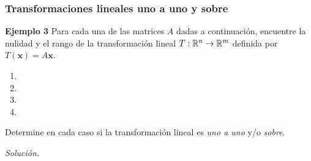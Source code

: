 \begin{frame}\frametitle{Transformaciones lineales uno a uno y sobre}

\begin{ej}{\textbf{Ejemplo 3}}
	\justifying
	Para cada una de las matrices $A$ dadas a continuación, encuentre la nulidad y el rango de la transformación lineal 
	$T:\mathbb{R}^n\to \mathbb{R}^m$ definida por $T(\mathbf{x}) = A\mathbf{x}$. 		
	\begin{multicols}{4}
		\begin{enumerate}
			\item[\labelname{$a$}] 
			\item[\labelname{$b$}] 
		
			\item[\labelname{$c$}] 	
			\item[\labelname{$d$}] 					
		\end{enumerate}				
	\end{multicols}
	Determine en cada caso si la transformación lineal es \textit{uno a uno} y/o \textit{sobre}.
\end{ej}
\textit{Solución.}


\end{frame}
